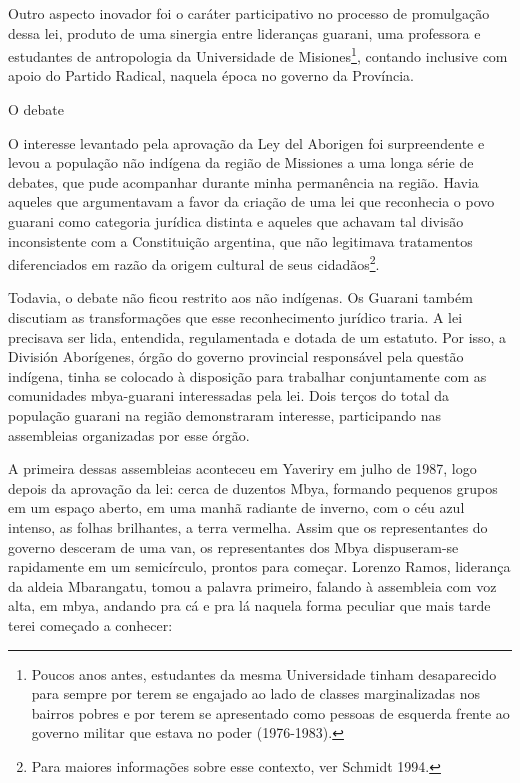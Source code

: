 \documentclass{article}
\begin{document}
Outro aspecto inovador foi o car\'ater participativo no processo de
promulga\c{c}\~ao dessa lei, produto de uma sinergia entre
lideran\c{c}as guarani, uma professora e estudantes de antropologia da
Universidade de Misiones\footnote{ Poucos anos antes, estudantes da
mesma Universidade tinham desaparecido para sempre por terem se
engajado ao lado de classes marginalizadas nos bairros pobres e por
terem se apresentado como pessoas de esquerda frente ao governo militar
que estava no poder (1976-1983).}, contando inclusive com apoio do
Partido Radical, naquela \'epoca no governo da Prov\'incia. 

O debate

O interesse levantado pela aprova\c{c}\~ao da Ley del Aborigen foi
surpreendente e levou a popula\c{c}\~ao n\~ao ind\'igena da regi\~ao de
Missiones a uma longa s\'erie de debates, que pude acompanhar durante
minha perman\^encia na regi\~ao. Havia aqueles que argumentavam a favor
da cria\c{c}\~ao de uma lei que reconhecia o povo guarani como
categoria jur\'idica distinta e aqueles que achavam tal divis\~ao
inconsistente com a Constitui\c{c}\~ao argentina, que n\~ao legitimava
tratamentos diferenciados em raz\~ao da origem cultural de seus
cidad\~aos\footnote{ Para maiores informa\c{c}\~oes sobre esse
contexto, ver Schmidt 1994.}. 

Todavia, o debate n\~ao ficou restrito aos n\~ao ind\'igenas. Os Guarani
tamb\'em discutiam as transforma\c{c}\~oes que esse reconhecimento
jur\'idico traria. A lei precisava ser lida, entendida, regulamentada e
dotada de um estatuto. Por isso, a Divisi\'on Abor\'igenes, \'org\~ao
do governo provincial respons\'avel pela quest\~ao ind\'igena, tinha se
colocado \`a disposi\c{c}\~ao para trabalhar conjuntamente com as
comunidades mbya-guarani interessadas pela lei. Dois ter\c{c}os do
total da popula\c{c}\~ao guarani na regi\~ao demonstraram interesse,
participando nas assembleias organizadas por esse \'org\~ao. 

A primeira dessas assembleias aconteceu em Yaveriry em julho de 1987,
logo depois da aprova\c{c}\~ao da lei: cerca de duzentos Mbya, formando
pequenos grupos em um espa\c{c}o aberto, em uma manh\~a radiante de
inverno, com o c\'eu azul intenso, as folhas brilhantes, a terra
vermelha.  Assim que os representantes do governo desceram de uma van,
os representantes dos Mbya dispuseram-se rapidamente em um
semic\'irculo, prontos para come\c{c}ar. Lorenzo Ramos, lideran\c{c}a
da aldeia Mbarangatu, tomou a palavra primeiro, falando \`a assembleia
com voz alta, em mbya, andando pra c\'a e pra l\'a naquela forma
peculiar que mais tarde terei come\c{c}ado a conhecer:
\end{document}

